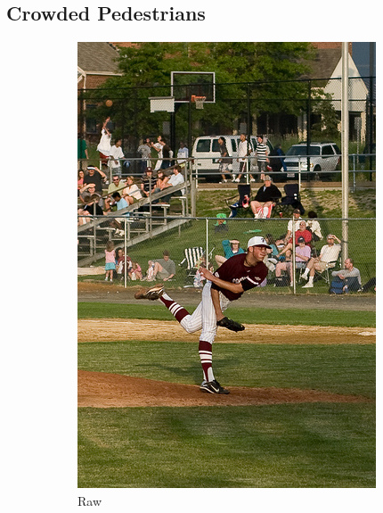 \subsection{Crowded Pedestrians}
\begin{figure}[!htbp]
\centering
\begin{subfigure}{.13\textwidth}
  \centering
  \includegraphics[width=\textwidth]{images/baseball.jpg}
  \caption{Raw}
  \label{fig:ogbaseball}
\end{subfigure}%
\begin{subfigure}{.2\textwidth}
  \centering

\end{subfigure}
\end{figure}
